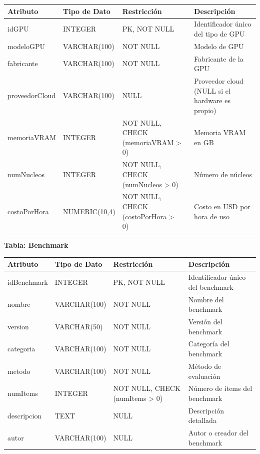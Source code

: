 \documentclass[12pt,a4paper]{article}
\begin{document}
\begin{longtable}{|>{\raggedright\arraybackslash}p{3.45cm}|>{\raggedright\arraybackslash}p{3.45cm}|>{\raggedright\arraybackslash}p{3.45cm}|>{\raggedright\arraybackslash}p{3.45cm}|}
\hline
\textbf{Atributo} & \textbf{Tipo de Dato} & \textbf{Restricción} & \textbf{Descripción} \\
\hline
idGPU & INTEGER & PK, NOT NULL & Identificador único del tipo de GPU \\
\hline
modeloGPU & VARCHAR(100) & NOT NULL & Modelo de GPU \\
\hline
fabricante & VARCHAR(100) & NOT NULL & Fabricante de la GPU \\
\hline
proveedorCloud & VARCHAR(100) & NULL & Proveedor cloud (NULL si el hardware es propio) \\
\hline
memoriaVRAM & INTEGER & NOT NULL, CHECK (memoriaVRAM > 0) & Memoria VRAM en GB \\
\hline
numNucleos & INTEGER & NOT NULL, CHECK (numNucleos > 0) & Número de núcleos \\
\hline
costoPorHora & NUMERIC(10,4) & NOT NULL, CHECK (costoPorHora >= 0) & Costo en USD por hora de uso \\
\hline
\end{longtable}

\textbf{Tabla: Benchmark}

\begin{longtable}{|>{\raggedright\arraybackslash}p{3.45cm}|>{\raggedright\arraybackslash}p{3.45cm}|>{\raggedright\arraybackslash}p{3.45cm}|>{\raggedright\arraybackslash}p{3.45cm}|}
\hline
\textbf{Atributo} & \textbf{Tipo de Dato} & \textbf{Restricción} & \textbf{Descripción} \\
\hline
idBenchmark & INTEGER & PK, NOT NULL & Identificador único del benchmark \\
\hline
nombre & VARCHAR(100) & NOT NULL & Nombre del benchmark \\
\hline
version & VARCHAR(50) & NOT NULL & Versión del benchmark \\
\hline
categoria & VARCHAR(100) & NOT NULL & Categoría del benchmark \\
\hline
metodo & VARCHAR(100) & NOT NULL & Método de evaluación \\
\hline
numItems & INTEGER & NOT NULL, CHECK (numItems > 0) & Número de ítems del benchmark \\
\hline
descripcion & TEXT & NULL & Descripción detallada \\
\hline
autor & VARCHAR(100) & NULL & Autor o creador del benchmark \\
\hline
\end{longtable}
\end{document}
